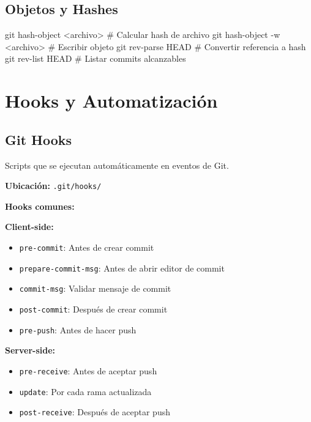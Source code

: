 \documentclass[
  doc,
  floatsintext,
  longtable,
  a4paper,
  nolmodern,
  notxfonts,
  notimes,
  12pt,
  colorlinks=true,linkcolor=blue,citecolor=blue,urlcolor=blue]{apa7}
\newenvironment{Shaded}{\begin{snugshade}}{\end{snugshade}}
\newcommand{\AttributeTok}[1]{\textcolor[rgb]{0.40,0.45,0.13}{#1}}
\newcommand{\CommentTok}[1]{\textcolor[rgb]{0.37,0.37,0.37}{#1}}
\newcommand{\FunctionTok}[1]{\textcolor[rgb]{0.28,0.35,0.67}{#1}}
\newcommand{\NormalTok}[1]{\textcolor[rgb]{0.00,0.23,0.31}{#1}}
\newcommand{\OperatorTok}[1]{\textcolor[rgb]{0.37,0.37,0.37}{#1}}
\providecommand{\tightlist}{%
  \setlength{\itemsep}{0pt}\setlength{\parskip}{0pt}}
\begin{document}
\subsection{Objetos y Hashes}\label{objetos-y-hashes}

\begin{Shaded}
\begin{Highlighting}[]
\FunctionTok{git}\NormalTok{ hash{-}object }\OperatorTok{\textless{}}\NormalTok{archivo}\OperatorTok{\textgreater{}}     \CommentTok{\# Calcular hash de archivo}
\FunctionTok{git}\NormalTok{ hash{-}object }\AttributeTok{{-}w} \OperatorTok{\textless{}}\NormalTok{archivo}\OperatorTok{\textgreater{}}  \CommentTok{\# Escribir objeto}
\FunctionTok{git}\NormalTok{ rev{-}parse HEAD            }\CommentTok{\# Convertir referencia a hash}
\FunctionTok{git}\NormalTok{ rev{-}list HEAD             }\CommentTok{\# Listar commits alcanzables}
\end{Highlighting}
\end{Shaded}

\section{Hooks y Automatización}\label{hooks-y-automatizaciuxf3n}

\subsection{Git Hooks}\label{git-hooks}

Scripts que se ejecutan automáticamente en eventos de Git.

\textbf{Ubicación:} \texttt{.git/hooks/}

\textbf{Hooks comunes:}

\textbf{Client-side:}

\begin{itemize}
\tightlist
\item
  \texttt{pre-commit}: Antes de crear commit
\item
  \texttt{prepare-commit-msg}: Antes de abrir editor de commit
\item
  \texttt{commit-msg}: Validar mensaje de commit
\item
  \texttt{post-commit}: Después de crear commit
\item
  \texttt{pre-push}: Antes de hacer push
\end{itemize}

\textbf{Server-side:}

\begin{itemize}
\tightlist
\item
  \texttt{pre-receive}: Antes de aceptar push
\item
  \texttt{update}: Por cada rama actualizada
\item
  \texttt{post-receive}: Después de aceptar push
\end{itemize}
\end{document}
